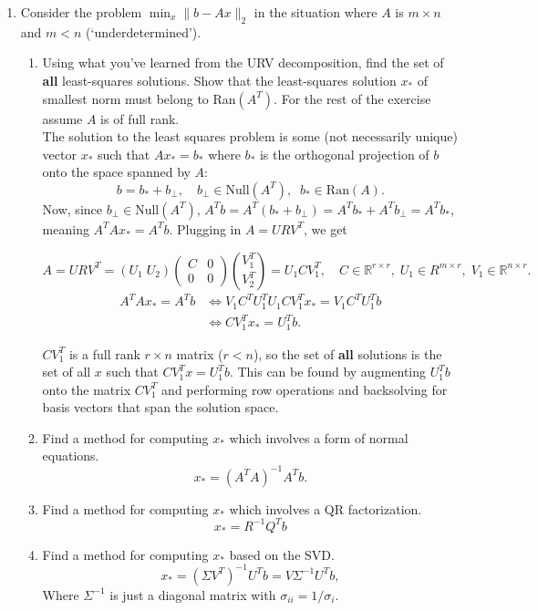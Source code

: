 \documentclass[11pt]{article}
\newcommand{\n}{\vspace{0.3cm}}
\newcommand{\R}{\mathbb{R}}
\begin{document}
\begin{enumerate}
	\item Consider the problem \(\min_x \lVert b - Ax \rVert_2\) in the situation where \(A\) is \(m \times n\) and \(m < n\) (`underdetermined').
	      \begin{enumerate}
		    \item Using what you've learned from the URV decomposition, find the set of \textbf{all} least-squares solutions.  Show that the least-squares solution \(x_*\) of smallest norm must belong to Ran\((A^T)\).  For the rest of the exercise assume \(A\) is of full rank. \n\\
          The solution to the least squares problem is some (not necessarily unique) vector \(x_*\) such that \(Ax_* = b_*\) where \(b_*\) is the orthogonal projection of \(b\) onto the space spanned by \(A\):
          \[b = b_* + b_\perp, \quad b_\perp \in \text{Null}(A^T), \;\; b_* \in \text{Ran}(A).\]
          Now, since \(b_\perp \in \text{Null}(A^T)\), \(A^T b = A^T(b_* + b_\perp) = A^T b_* + A^T b_\perp = A^T b_*\), meaning \(A^T Ax_* = A^T b\).  Plugging in \(A = URV^T\), we get

          \[A = URV^T = (U_1 \; U_2) \begin{pmatrix} C & 0 \\ 0 & 0 \end{pmatrix} \binom{V_1^T}{V_2^T} = U_1 C V_1^T, \quad C \in \R^{r \times r}, \; U_1 \in R^{m \times r}, \; V_1 \in \R^{n \times r}.\]
          \begin{align*}
            A^T Ax_* = A^T b &\iff V_1 C^T U_1^T U_1 C V_1^T x_* = V_1 C^T U_1^T b \\
            &\iff C V_1^T x_* = U_1^T b.
          \end{align*}

          \(CV_1^T\) is a full rank \(r \times n\) matrix (\(r < n\)), so the set of \textbf{all} solutions is the set of all \(x\) such that \(C V_1^T x = U_1^T b\).  This can be found by augmenting \(U_1^T b\) onto the matrix \(C V_1^T\) and performing row operations and backsolving for basis vectors that span the solution space. \n

		      \item Find a method for computing \(x_*\) which involves a form of normal equations.
            \[x_* = (A^T A)^{-1} A^T b.\]
		      \item Find a method for computing \(x_*\) which involves a QR factorization.
            \[x_* = R^{-1} Q^T b\]
		      \item Find a method for computing \(x_*\) based on the SVD.
            \[x_* = (\Sigma V^T)^{-1} U^T b = V \Sigma^{-1} U^T b,\]
            Where \(\Sigma^{-1}\) is just a diagonal matrix with \(\sigma_{ii} = 1 / \sigma_i\).
	      \end{enumerate}


\end{enumerate}
\end{document}
